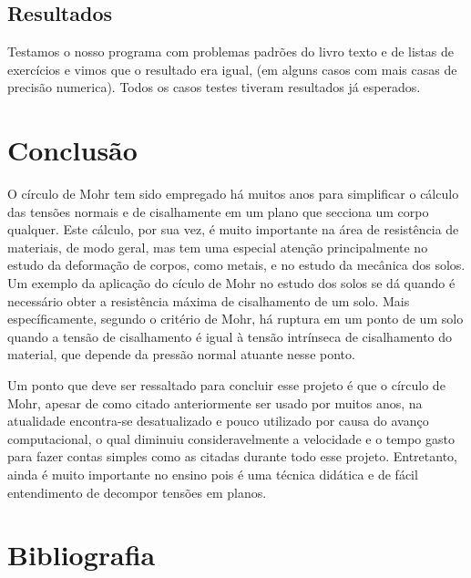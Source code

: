 \documentclass[a4paper]{article}
\begin{document}
\subsection{Resultados}
Testamos o nosso programa com problemas padrões do livro texto e de listas de exercícios e vimos que o resultado era igual, (em alguns casos com mais casas de precisão numerica). Todos os casos testes tiveram resultados já esperados.

\section{Conclusão}

O círculo de Mohr tem sido empregado há muitos anos para simplificar o cálculo das tensões normais e de cisalhamente em um plano que secciona um corpo qualquer. Este cálculo, por sua vez, é muito importante na área de resistência de materiais, de modo geral, mas tem uma especial atenção principalmente no estudo da deformação de corpos, como metais, e no estudo da mecânica dos solos. Um exemplo da aplicação do cículo de Mohr no estudo dos solos se dá quando é necessário obter a resistência máxima de cisalhamento de um solo. Mais específicamente, segundo o critério de Mohr, há ruptura em um ponto de um solo quando a tensão de cisalhamento é igual à tensão intrínseca de cisalhamento do material, que depende da pressão normal atuante nesse ponto.

Um ponto que deve ser ressaltado para concluir esse projeto é que o círculo de Mohr, apesar de como citado anteriormente ser usado por muitos anos, na atualidade encontra-se desatualizado e pouco utilizado por causa do avanço computacional, o qual diminuiu consideravelmente a velocidade e o tempo gasto para fazer contas simples como as citadas durante todo esse projeto. Entretanto, ainda é muito importante no ensino pois é uma técnica didática e de fácil entendimento de decompor tensões em planos.

\section{Bibliografia}


\end{document}
